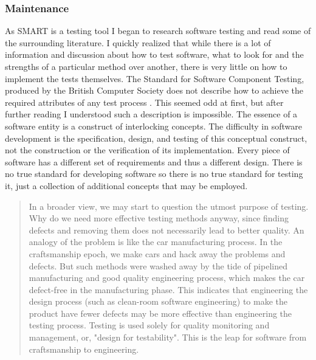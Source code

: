 \documentclass[a4paper, 11pt, titlepage]{article}
\begin{document}
\subsubsection{Maintenance} 
As SMART is a testing tool I began to research software testing and read some of the surrounding literature. I quickly realized that while there is a lot of information and discussion about how to test software, what to look for and the strengths of a particular method over another, there is very little on how to implement the tests themselves. The Standard for Software Component Testing, produced by the British Computer Society does not describe how to achieve the required attributes of any test process \cite{BCStesting}. This seemed odd at first, but after further reading I understood such a description is impossible. The essence of a software entity is a construct of interlocking concepts. The difficulty in software development is the specification, design, and testing of this conceptual construct, not the construction or the verification of its implementation. \cite{NoBullet} Every piece of software has a different set of requirements and thus a different design. There is no true standard for developing software so there is no true standard for testing it, just a collection of additional concepts that may be employed.  
\begin{quote} 
In a broader view, we may start to question the utmost purpose of testing. Why do we need more effective testing methods anyway, since finding defects and removing them does not necessarily lead to better quality. An analogy of the problem is like the car manufacturing process. In the craftsmanship epoch, we make cars and hack away the problems and defects. But such methods were washed away by the tide of pipelined manufacturing and good quality engineering process, which makes the car defect-free in the manufacturing phase. This indicates that engineering the design process (such as clean-room software engineering) to make the product have fewer defects may be more effective than engineering the testing process. Testing is used solely for quality monitoring and management, or, "design for testability". This is the leap for software from craftsmanship to engineering. 
\end{quote} \cite{cMellonTest} 
 
\end{document}
